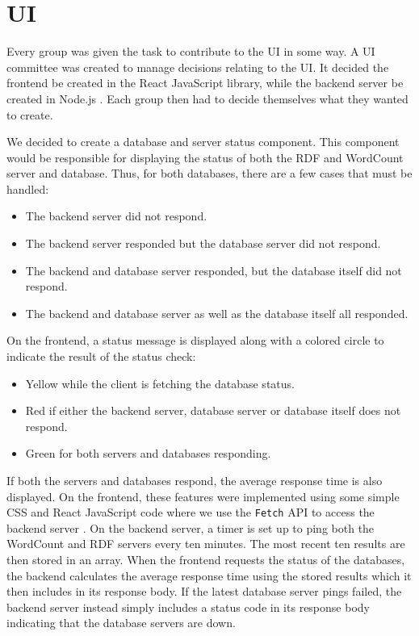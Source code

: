 \section{UI}
Every group was given the task to contribute to the \knox{} UI in some way. 
A UI committee was created to manage decisions relating to the UI. 
It decided the frontend be created in the React JavaScript library, while the backend server be created in Node.js .
Each group then had to decide themselves what they wanted to create. 


We decided to create a database and server status component. 
This component would be responsible for displaying the status of both the RDF and WordCount server and database. 
Thus, for both databases, there are a few cases that must be handled:
\begin{itemize}
	\item The backend server did not respond.
	\item The backend server responded but the database server did not respond.
	\item The backend and database server responded, but the database itself did not respond.
	\item The backend and database server as well as the database itself all responded.
\end{itemize}

On the frontend, a status message is displayed along with a colored circle to indicate the result of the status check:
\begin{itemize}
	\item Yellow while the client is fetching the database status.
	\item Red if either the backend server, database server or database itself does not respond.
	\item Green for both servers and databases responding.
\end{itemize}
If both the servers and databases respond, the average response time is also displayed.
On the frontend, these features were implemented using some simple CSS and React JavaScript code where we use the \texttt{Fetch} API to access the backend server . 
On the backend server, a timer is set up to ping both the WordCount and RDF servers every ten minutes.
The most recent ten results are then stored in an array.
When the frontend requests the status of the databases, the backend calculates the average response time using the stored results which it then includes in its response body.
If the latest database server pings failed, the backend server instead simply includes a status code in its response body indicating that the database servers are down.



